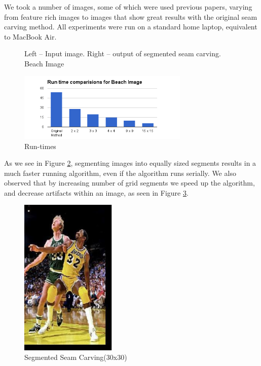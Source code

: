 \documentclass[conference]{acmsiggraph}
\begin{document}
We took a number of images, some of which were used previous papers, varying from feature rich images to images that show great results with the original seam carving method. All experiments were run on a standard home laptop, equivalent to MacBook Air.


\begin{figure}[ht]       
    \caption{Left -- Input image. Right -- output of segmented seam carving. Beach Image}
    \label{materialflowChart}
\end{figure}


\begin{figure}[ht]
  \centering
  \includegraphics[width=3.2in]{images/beach}
  \caption{ Run-times}
  \label{fig:runtimes}
\end{figure}


As we see in Figure \ref{fig:runtimes}, segmenting images into equally sized segments results in a much faster running algorithm, even if the algorithm runs serially. We also observed that by increasing number of grid segments we speed up the algorithm, and decrease artifacts within an image, as seen in Figure \ref{fig:bird3232}.


\begin{figure}[ht]
  \centering
  \includegraphics[width=1.8in]{images/bird_32by32}
  \caption{ Segmented Seam Carving(30x30)
  }
  \label{fig:bird3232}
\end{figure}
\end{document}
